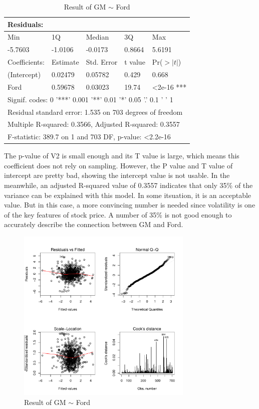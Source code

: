 \documentclass[11pt, conference]{IEEEtran}
\begin{document}
\begin{table}[!t]
\centering
\caption{Result of GM $\sim$ Ford}
\label{tab2}
\begin{tabular}{lllll}
\hline
Residuals:        &             &               &           &                       \\
\hline
Min               & 1Q          & Median        & 3Q        & Max                   \\
-5.7603           & -1.0106     & -0.0173       & 0.8664    & 5.6191                \\
\hline
\hline
Coefficients:     & Estimate    & Std. Error    & t value   & Pr($>|t|$)   \\
\hline
(Intercept)       & 0.02479     & 0.05782       & 0.429     & 0.668                 \\
Ford                & 0.59678     & 0.03023       & 19.74     & \textless2e-16 *** \\
\hline
\hline
\multicolumn{5}{l}{Signif. codes:  0 '***' 0.001 '**' 0.01 '*' 0.05 '.' 0.1 ' ' 1}  \\
\multicolumn{5}{l}{Residual standard error: 1.535 on 703 degrees of freedom}        \\
\multicolumn{5}{l}{Multiple R-squared:  0.3566,    Adjusted R-squared:  0.3557}     \\
\multicolumn{5}{l}{F-statistic: 389.7 on 1 and 703 DF,  p-value: \textless 2.2e-16} \\
\hline

\end{tabular}
\end{table}

The p-value of V2 is small enough and its T value is large, which means this coefficient does not rely on sampling. However, the P value and T value of intercept are pretty bad, showing the intercept value is not usable. In the meanwhile, an adjusted R-squared value of 0.3557 indicates that only 35\% of the variance can be explained with this model. In some itsuation, it is an acceptable value. But in this case, a more convincing number is needed since volatility is one of the key features of stock price. A number of 35\% is not good enough to accurately describe the connection between GM and Ford. 

\begin{figure}[!h]
\centering
\includegraphics[width=3.3in]{fig1.pdf}
\caption{Result of GM $\sim$ Ford}
\label{fig1}
\end{figure}
\end{document}
